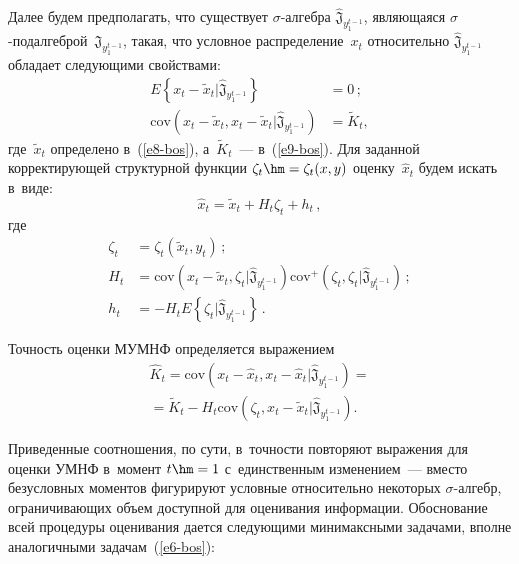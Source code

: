 \begin{multicols}{2}
    Далее будем предполагать, что существует $\sigma$-ал\-геб\-ра 
$\hat{\mathfrak{J}}_{y_1^{t-1}}$, являющаяся 
$\sigma$-под\-ал\-геб\-рой~$\mathfrak{J}_{y_1^{t-1}}$, такая, что условное 
распределение~$x_t$ относительно $\hat{\mathfrak{J}}_{y_1^{t-1}}$ обладает 
следующими свойствами: 
\begin{align*}
E\left\{x_t- \tilde{x}_t\vert \hat{\mathfrak{J}}_{y_1^{t-1}}\right\}&=0\,;\\
\mathrm{cov}\left (x_t- \tilde{x}_t, x_t- 
\tilde{x}_t\vert \hat{\mathfrak{J}}_{y_1^{t-1}}\right)&=\tilde{K}_t,
\end{align*} 
где~$\tilde{x}_t$ определено в~(\ref{e8-bos}), а~$\tilde{K}_t$~--- в~(\ref{e9-bos}). Для 
заданной корректирующей структурной функции $\zeta_t\hm= \zeta_t(x,y)$ 
оценку~$\hat{x}_t$ будем искать в~виде:
    \begin{equation}
    \hat{x}_t=\tilde{x}_t+H_t\zeta_t + h_t\,,
        \label{e10-bos}
    \end{equation}
    где
\begin{align*}
\zeta_t&=\zeta_t \left( \tilde{x}_t,  y_t\right)\,;\\
    H_t&= \mathrm{cov}\left( x_t-\tilde{x}_t,\zeta_t\vert \hat{\mathfrak{J}}_{y_1^{t-
1}}\right) \mathrm{cov}^+ \left( \zeta_t, \zeta_t\vert\hat{\mathfrak{J}}_{y_1^{t-1}}
\right)\,;\\ 
h_t&=-H_tE\left\{ \zeta_t\vert \hat{\mathfrak{J}}_{y_1^{t-1}}\right\}\,.
       \end{align*}
    
    Точность оценки МУМНФ определяется выражением
    \begin{multline}
    \hat{K}_t=\mathrm{cov}\left( x_t-\hat{x}_t, x_t-\hat{x}_t\vert 
\hat{\mathfrak{J}}_{y_1^{t-1}}\right) ={}\\
{}=\tilde{K}_t-H_t \mathrm{cov} \left( \zeta_t, x_t-
\tilde{x}_t\vert \hat{\mathfrak{J}}_{y_1^{t-1}}\right).
    \label{e11-bos}
    \end{multline}
    
    Приведенные соотношения, по сути, в~точ\-ности повторяют выражения для 
оценки УМНФ в~момент $t\hm=1$ с~единственным изменением~--- вместо 
безусловных моментов фигурируют услов\-ные относительно некоторых 
$\sigma$-ал\-гебр, огра\-ни\-чивающих объем доступной для оценивания\linebreak 
информации. Обосно\-ва\-ние всей процедуры оценивания дается следующими 
минимаксными задачами, вполне аналогичными задачам~(\ref{e6-bos}):


\end{multicols}

